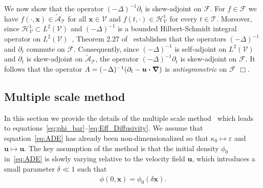 \documentclass[leqno,onefignum,onetabnum]{siamltex1213}
\newcommand{\Tc}{\mathcal{T}}
\newcommand{\Vc}{\mathcal{V}}
\newcommand{\Hs}{\mathscr{H}}
\newcommand{\As}{\mathscr{A}}
\newcommand{\Fs}{\mathscr{F}}
\newcommand\bnabla{\mbox{\boldmath${\nabla}$}}
\providecommand\bcdot{\boldsymbol{\cdot}}
\newcommand{\vecx}{\boldsymbol{x}}
\newcommand{\vecu}{\boldsymbol{u}}
\begin{document}
%
We now show that the operator $(-\Delta)^{-1}\partial_t$ is skew-adjoint on
$\Fs$. For $f\in\Fs$ we have $f(\cdot,\vecx)\in\tilde{\As}_{\Tc}$ for all
$\vecx\in\Vc$ and $f(t,\cdot)\in\Hs^1_{\Vc}$ for every $t\in\Tc$. Moreover,
since $\Hs^1_{\Vc}\subset L^2(\Vc)$ and $(-\Delta)^{-1}$ is a bounded
Hilbert-Schmidt integral operator on $L^2(\Vc)$~\cite{Stakgold:BVP:2000},
Theorem 2.27 of~\cite{Folland:99:RealAnalysis} establishes that the operators
$(-\Delta)^{-1}$ and $\partial_t$ commute on $\Fs$. Consequently, since
$(-\Delta)^{-1}$ is self-adjoint on $L^2(\Vc)$ and $\partial_t$ is skew-adjoint on
$\tilde{\As}_{\Tc}$, the operator $(-\Delta)^{-1}\partial_t$ is skew-adjoint on
$\Fs$. It follows that the operator
$A=(-\Delta)^{-1}(\partial_t-\vecu\bcdot\bnabla)$ is \emph{antisymmetric} on
$\Fs$ $\Box$.  


\newpage
\subsection{Multiple scale method}\label{sec:Multiscal_Method}
%
In this section we provide the details of the multiple scale
method~\cite{McLaughlin:SIAM_JAM:780,Papanicolaou:1981:36:8,Papanicolaou:RF-835,Bensoussan:Book:1978} 
which leads to
equations~\eqref{eq:phi_bar}--\eqref{eq:Eff_Diffusivity}. We assume
that 
equation~\eqref{eq:ADE} has already been non-dimensionalized so that
$\kappa_0\mapsto\varepsilon$ and $\vecu \mapsto\vecu $. The key assumption of the method is
that the initial density $\phi_0$ in~\eqref{eq:ADE} is slowly
varying relative to the velocity field $\vecu $, which introduces a
small parameter $\delta\ll1$ such that  
% 
\begin{align}\label{eq:IC} 
  \phi(0,\vecx)=\phi_0(\delta\vecx).
\end{align}
%
\end{document}
